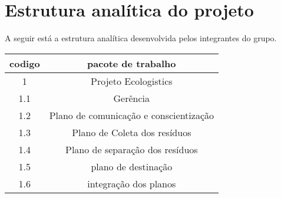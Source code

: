 \section{Estrutura analítica do projeto}

A seguir está a estrutura analítica desenvolvida pelos integrantes
do grupo.

\begin{table}[ht]
  \centering
  \begin{tabular}{|c|c|}
    \hline
    codigo & pacote de trabalho \\
    \hline
    1 &  Projeto Ecologistics \\
    \hline
    1.1 & Gerência \\
    \hline
    1.2 & Plano de comunicação e conscientização  \\
    \hline
    1.3 & Plano de Coleta dos resíduos \\
    \hline
    1.4 & Plano de separação dos resíduos  \\
    \hline
    1.5 & plano de destinação  \\
    \hline
    1.6 & integração dos planos \\
    \hline
  \end{tabular}
\end{table}
